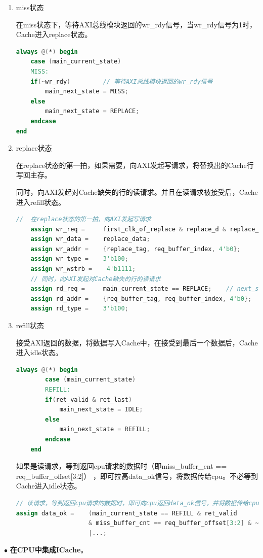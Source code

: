 \documentclass[11pt]{article}
\begin{document}
\begin{enumerate}
\begin{enumerate}
\item miss状态

在miss状态下，等待AXI总线模块返回的wr\_rdy信号，当wr\_rdy信号为1时，Cache进入replace状态。
\begin{lstlisting}[language=verilog]
always @(*) begin
    case (main_current_state)
    MISS:
    if(~wr_rdy)         // 等待AXI总线模块返回的wr_rdy信号
        main_next_state = MISS;
    else
        main_next_state = REPLACE;
    endcase
end
\end{lstlisting}
\item replace状态

在replace状态的第一拍，如果需要，向AXI发起写请求，将替换出的Cache行写回主存。

同时，向AXI发起对Cache缺失的行的读请求。并且在读请求被接受后，Cache进入refill状态。
\begin{lstlisting}[language=verilog]
    //  在replace状态的第一拍，向AXI发起写请求
    assign wr_req =     first_clk_of_replace & replace_d & replace_v;
    assign wr_data =    replace_data;
    assign wr_addr =    {replace_tag, req_buffer_index, 4'b0};
    assign wr_type =    3'b100;
    assign wr_wstrb =    4'b1111;
    // 同时，向AXI发起对Cache缺失的行的读请求
    assign rd_req =     main_current_state == REPLACE;    // next_state == replace
    assign rd_addr =    {req_buffer_tag, req_buffer_index, 4'b0};
    assign rd_type =    3'b100;
\end{lstlisting}


\item refill状态

接受AXI返回的数据，将数据写入Cache中，在接受到最后一个数据后，Cache进入idle状态。
\begin{lstlisting}[language=verilog]
    always @(*) begin
        case (main_current_state)
        REFILL:
        if(ret_valid & ret_last)
            main_next_state = IDLE;
        else
            main_next_state = REFILL;
        endcase
    end
    \end{lstlisting}
如果是读请求，等到返回cpu请求的数据时（即miss\_buffer\_cnt == req\_buffer\_offset[3:2]）
，即可拉高data\_ok信号，将数据传给cpu。不必等到Cache进入idle状态。
\begin{lstlisting}[language=verilog]
// 读请求，等到返回cpu请求的数据时，即可向cpu返回data_ok信号，并将数据传给cpu
assign data_ok =    (main_current_state == REFILL & ret_valid 
                    & miss_buffer_cnt == req_buffer_offset[3:2] & ~req_buffer_op)
                    |...;
\end{lstlisting}
\end{enumerate}
    
\end{enumerate}
$\bullet$
\textbf{在CPU中集成ICache}。
\end{document}
